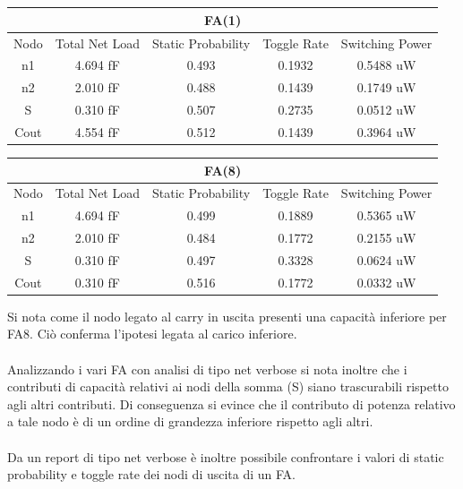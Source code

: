 \documentclass[11pt,  english, makeidx, a4paper, titlepage, oneside]{book}
\begin{document}
\\\\
\begin{center}
	\begin{tabular}{|c|c|c|c|c|}
	\multicolumn{5}{c}{FA(1) }\\
	\hline
	Nodo &  Total Net Load & Static Probability & Toggle Rate & Switching Power \\ 
	\hline
	n1 & 4.694 fF & 0.493 & 0.1932 & 0.5488 uW  \\
	\hline
	n2 & 2.010 fF & 0.488 & 0.1439 & 0.1749 uW  \\
	\hline
	S & 0.310 fF & 0.507 & 0.2735 & 0.0512 uW  \\
	\hline
	Cout & 4.554 fF & 0.512 &  0.1439 & 0.3964 uW  \\
	\hline
	\end{tabular}
\end{center}
\vspace{0.3cm}
\begin{center}
	\begin{tabular}{|c|c|c|c|c|}
	\multicolumn{5}{c}{FA(8) }\\
	\hline
	Nodo &  Total Net Load & Static Probability & Toggle Rate & Switching Power \\ 
	\hline
	n1 & 4.694 fF & 0.499 & 0.1889 & 0.5365 uW  \\
	\hline
	n2 & 2.010 fF & 0.484 & 0.1772 & 0.2155 uW  \\
	\hline
	S & 0.310 fF & 0.497 & 0.3328 & 0.0624 uW  \\
	\hline
	Cout & 0.310 fF & 0.516 &  0.1772 & 0.0332 uW  \\
	\hline
	\end{tabular}
\end{center}
\vspace{0.3cm}
Si nota come il nodo legato al carry in uscita presenti una capacità inferiore per FA8. Ciò conferma l'ipotesi legata al carico inferiore.
\\\\
Analizzando i vari FA con analisi di tipo net verbose si nota inoltre che i contributi di capacità relativi ai nodi della somma (S) siano trascurabili rispetto agli altri contributi.
Di conseguenza si evince che il contributo di potenza relativo a tale nodo è di un ordine di grandezza inferiore rispetto agli altri.
\\\\
Da un report di tipo net verbose è inoltre possibile confrontare i valori di static probability e toggle rate dei nodi di uscita di un FA.
\end{document}
